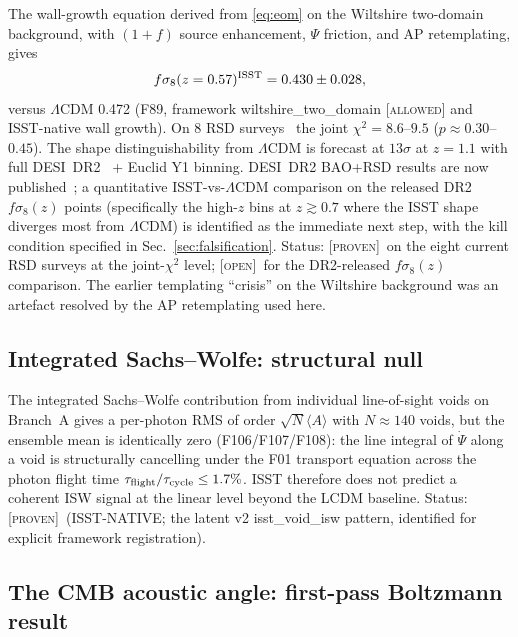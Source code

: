 \documentclass[aps,prd,twocolumn,nofootinbib,floatfix,superscriptaddress]{revtex4-2}
\newcommand{\PROVEN}{{\color{black!75!green}\textsc{[proven]}}}
\newcommand{\OPEN}{{\color{black!60!red}\textsc{[open]}}}
\begin{document}
The wall-growth equation derived from \eqref{eq:eom} on the
Wiltshire two-domain background, with $(1+f)$ source enhancement,
$\Psi$ friction, and AP retemplating, gives
\begin{equation}
f\sigma_8(z=0.57)^{\rm ISST} = 0.430\pm 0.028,
\end{equation}
versus $\Lambda$CDM 0.472 (F89, framework
\textsf{wiltshire\_two\_domain} \textsc{[allowed]} and
ISST-native wall growth). On 8 RSD surveys~\cite{BeutlerEtAl2012,HowlettEtAl2015,AlamEtAl2017,BlakeEtAl2012,PezzottaEtAl2017,Adil2024}
the joint $\chi^2 = 8.6$--$9.5$ ($p\approx 0.30$--$0.45$). The shape
distinguishability from $\Lambda$CDM is forecast at $13\sigma$ at
$z=1.1$ with full DESI~DR2~\cite{DESIDR2,DESIDR1} + Euclid Y1
\cite{EuclidForecast,EuclidYellow} binning. DESI~DR2 BAO+RSD
results are now published~\cite{DESIDR2}; a quantitative
ISST-vs-$\Lambda$CDM comparison on the released DR2 $f\sigma_8(z)$
points (specifically the high-$z$ bins at $z\gtrsim 0.7$ where the
ISST shape diverges most from $\Lambda$CDM) is identified as the
immediate next step, with the kill condition specified in
Sec.~\ref{sec:falsification}. Status: \PROVEN\ on the eight current
RSD surveys at the joint-$\chi^2$ level; \OPEN\ for the
DR2-released $f\sigma_8(z)$ comparison. The earlier templating
``crisis'' on the Wiltshire background was an artefact resolved by
the AP retemplating used here.

\subsection{Integrated Sachs--Wolfe: structural null}

The integrated Sachs--Wolfe contribution from individual line-of-sight
voids on Branch~A gives a per-photon RMS of order
$\sqrt{N}\langle A\rangle$ with $N\approx 140$ voids, but the
ensemble mean is identically zero (F106/F107/F108): the line integral
of $\dot\Psi$ along a void is structurally cancelling under the F01
transport equation across the photon flight time
$\tau_{\rm flight}/\tau_{\rm cycle}\leq 1.7\%$. ISST therefore does
not predict a coherent ISW signal at the linear level beyond the
LCDM baseline. Status: \PROVEN\ (ISST-NATIVE; the latent v2
\textsf{isst\_void\_isw} pattern, identified for explicit framework
registration).

\subsection{The CMB acoustic angle: first-pass Boltzmann result}
\label{sec:theta}
\end{document}
